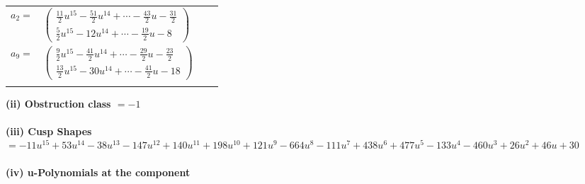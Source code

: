 \documentclass[1p]{elsarticle_modified}
\theoremstyle{definition}
\begin{document}
\begin{tabular}{m{7pt} m{180pt} m{7pt} m{180pt} }
\flushright $a_{2}=$&$\begin{pmatrix}\frac{11}{2} u^{15}-\frac{51}{2} u^{14}+\cdots-\frac{43}{2} u-\frac{31}{2}\\\frac{5}{2} u^{15}-12 u^{14}+\cdots-\frac{19}{2} u-8\end{pmatrix}$ \\
\flushright $a_{9}=$&$\begin{pmatrix}\frac{9}{2} u^{15}-\frac{41}{2} u^{14}+\cdots-\frac{29}{2} u-\frac{23}{2}\\\frac{13}{2} u^{15}-30 u^{14}+\cdots-\frac{41}{2} u-18\end{pmatrix}$\\&\end{tabular}
\flushleft \textbf{(ii) Obstruction class $= -1$}\\~\\
\flushleft \textbf{(iii) Cusp Shapes $= -11 u^{15}+53 u^{14}-38 u^{13}-147 u^{12}+140 u^{11}+198 u^{10}+121 u^9-664 u^8-111 u^7+438 u^6+477 u^5-133 u^4-460 u^3+26 u^2+46 u+30$}\\~\\
\newpage\renewcommand{\arraystretch}{1}
\flushleft \textbf{(iv) u-Polynomials at the component}\newline \\
\end{document}

